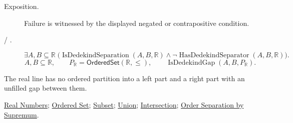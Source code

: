 \begin{remark*}
\begin{description}
  \item[Exposition.]
  Failure is witnessed by the displayed negated or contrapositive condition.

  \item[ / .]
  \[
\exists A,B\subseteq\mathbb{R}\;
\bigl(\operatorname{IsDedekindSeparation}(A,B,\mathbb{R})\land
\neg\operatorname{HasDedekindSeparator}(A,B,\mathbb{R})\bigr).
\]
\[
A,B\subseteq\mathbb{R},\qquad P_{\mathbb{R}}=\mathsf{OrderedSet}(\mathbb{R},\leq),\qquad
\operatorname{IsDedekindGap}(A,B,P_{\mathbb{R}}).
\]
\end{description}
\end{remark*}
\begin{remark*}[Interpretation]
The real line has no ordered partition into a left part and a right part with
an unfilled gap between them.
\end{remark*}
\begin{dependencies}
\hyperref[def:reals]{Real Numbers};
\hyperref[def:ordered-set]{Ordered Set};
\hyperref[def:subset]{Subset};
\hyperref[def:union]{Union};
\hyperref[def:intersection]{Intersection};
\hyperref[thm:order-separation-by-supremum]{Order Separation by Supremum}.
\end{dependencies}

